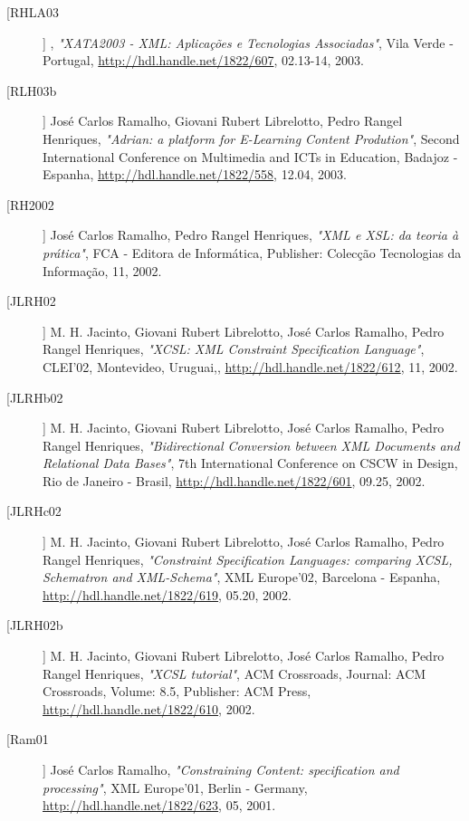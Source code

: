 \begin{description}
\item[[RHLA03]]
    \textsf{}, \emph{"XATA2003 - XML: Aplicações e Tecnologias Associadas"}, Vila Verde - Portugal, \url{http://hdl.handle.net/1822/607}, 02.13-14, 2003.

\item[[RLH03b]]
    \textsf{José Carlos Ramalho, Giovani Rubert Librelotto, Pedro Rangel Henriques}, \emph{"Adrian: a platform for E-Learning Content Prodution"}, Second International Conference on Multimedia and ICTs in Education, Badajoz - Espanha, \url{http://hdl.handle.net/1822/558}, 12.04, 2003.

\item[[RH2002]]
    \textsf{José Carlos Ramalho, Pedro Rangel Henriques}, \emph{"XML e XSL: da teoria à prática"}, FCA - Editora de Informática, Publisher: Colecção Tecnologias da Informação, 11, 2002.

\item[[JLRH02]]
    \textsf{M. H.  Jacinto, Giovani Rubert Librelotto, José Carlos Ramalho, Pedro Rangel Henriques}, \emph{"XCSL: XML Constraint Specification Language"}, CLEI'02, Montevideo, Uruguai,, \url{http://hdl.handle.net/1822/612}, 11, 2002.

\item[[JLRHb02]]
    \textsf{M. H.  Jacinto, Giovani Rubert Librelotto, José Carlos Ramalho, Pedro Rangel Henriques}, \emph{"Bidirectional Conversion between XML Documents and Relational Data Bases"}, 7th International Conference on CSCW in  Design, Rio de Janeiro - Brasil, \url{http://hdl.handle.net/1822/601}, 09.25, 2002.

\item[[JLRHc02]]
    \textsf{M. H.  Jacinto, Giovani Rubert Librelotto, José Carlos Ramalho, Pedro Rangel Henriques}, \emph{"Constraint Specification Languages: comparing XCSL, Schematron and XML-Schema"}, XML Europe'02, Barcelona - Espanha, \url{http://hdl.handle.net/1822/619}, 05.20, 2002.

\item[[JLRH02b]]
    \textsf{M. H.  Jacinto, Giovani Rubert Librelotto, José Carlos Ramalho, Pedro Rangel Henriques}, \emph{"XCSL tutorial"}, ACM Crossroads, Journal: ACM Crossroads, Volume: 8.5, Publisher: ACM Press, \url{http://hdl.handle.net/1822/610}, 2002.

\item[[Ram01]]
    \textsf{José Carlos Ramalho}, \emph{"Constraining Content: specification and processing"}, XML Europe'01, Berlin - Germany, \url{http://hdl.handle.net/1822/623}, 05, 2001.


\end{description}
